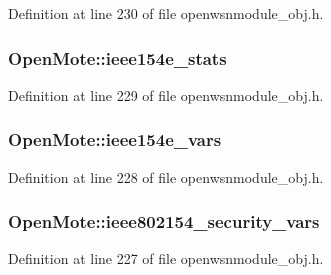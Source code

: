 Definition at line 230 of file openwsnmodule\+\_\+obj.\+h.

\subsubsection[{\texorpdfstring{ieee154e\+\_\+stats}{ieee154e_stats}}]{ Open\+Mote\+::ieee154e\+\_\+stats}\hypertarget{struct_open_mote_aad80fcc3f8dc5dae8184c964a3ebcb77}{}\label{struct_open_mote_aad80fcc3f8dc5dae8184c964a3ebcb77}


Definition at line 229 of file openwsnmodule\+\_\+obj.\+h.

\subsubsection[{\texorpdfstring{ieee154e\+\_\+vars}{ieee154e_vars}}]{ Open\+Mote\+::ieee154e\+\_\+vars}\hypertarget{struct_open_mote_ab16c29e7d0986128622698836ea1d01f}{}\label{struct_open_mote_ab16c29e7d0986128622698836ea1d01f}


Definition at line 228 of file openwsnmodule\+\_\+obj.\+h.

\subsubsection[{\texorpdfstring{ieee802154\+\_\+security\+\_\+vars}{ieee802154_security_vars}}]{ Open\+Mote\+::ieee802154\+\_\+security\+\_\+vars}\hypertarget{struct_open_mote_a2e1cf098b70a212c0137dcabf8a51326}{}\label{struct_open_mote_a2e1cf098b70a212c0137dcabf8a51326}


Definition at line 227 of file openwsnmodule\+\_\+obj.\+h.

